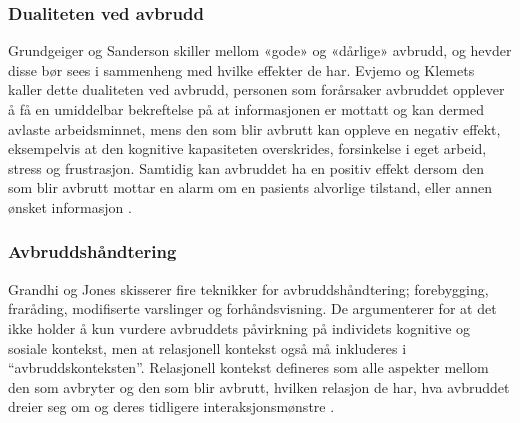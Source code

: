\subsubsection{Dualiteten ved avbrudd}
Grundgeiger og Sanderson skiller mellom «gode» og «dårlige» avbrudd, og hevder disse bør sees i sammenheng med hvilke effekter de har. Evjemo og Klemets kaller dette dualiteten ved avbrudd, personen som forårsaker avbruddet opplever å få en umiddelbar bekreftelse på at informasjonen er mottatt og kan dermed avlaste arbeidsminnet, mens den som blir avbrutt kan oppleve en negativ effekt, eksempelvis at den kognitive kapasiteten overskrides, forsinkelse i eget arbeid, stress og frustrasjon. Samtidig kan avbruddet ha en positiv effekt dersom den som blir avbrutt mottar en alarm om en pasients alvorlige tilstand, eller annen ønsket informasjon \cite{Evjemo, Grundgeiger09}. 

\subsubsection{Avbruddshåndtering}
Grandhi og Jones skisserer fire teknikker for avbruddshåndtering; forebygging, fraråding, modifiserte varslinger og forhåndsvisning. De argumenterer for at det ikke holder å kun vurdere avbruddets påvirkning på individets kognitive og sosiale kontekst, men at relasjonell kontekst også må inkluderes i “avbruddskonteksten”. Relasjonell kontekst defineres som alle aspekter mellom den som avbryter og den som blir avbrutt, hvilken relasjon de har, hva avbruddet dreier seg om og deres tidligere interaksjonsmønstre \cite{Grandhi10}.
